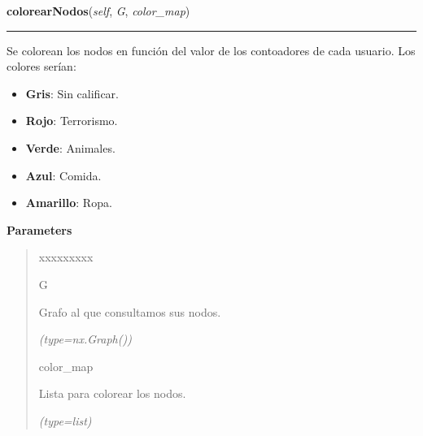 \hspace{.8\funcindent}\begin{boxedminipage}{\funcwidth}

    \raggedright \textbf{colorearNodos}(\textit{self}, \textit{G}, \textit{color\_map})

    \vspace{-1.5ex}

    \rule{\textwidth}{0.5\fboxrule}
\setlength{\parskip}{2ex}
    Se colorean los nodos en función del valor de los contoadores de cada 
    usuario. Los colores serían:

    \begin{itemize}
    \setlength{\parskip}{0.6ex}
      \item \textbf{Gris}: Sin calificar.

      \item \textbf{Rojo}: Terrorismo.

      \item \textbf{Verde}: Animales.

      \item \textbf{Azul}: Comida.

      \item \textbf{Amarillo}: Ropa.

    \end{itemize}

\setlength{\parskip}{1ex}
      \textbf{Parameters}
      \vspace{-1ex}

      \begin{quote}
        \begin{Ventry}{xxxxxxxxx}

          \item[G]

          Grafo al que consultamos sus nodos.

            {\it (type=nx.Graph())}

          \item[color\_map]

          Lista para colorear los nodos.

            {\it (type=list)}

        \end{Ventry}

      \end{quote}

    \end{boxedminipage}

    \label{grafo:Grafo:borrarGrafo}

